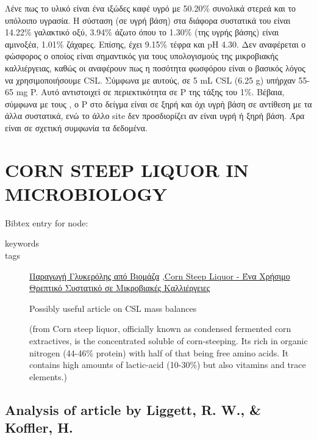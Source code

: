\documentclass[11pt]{article}
\begin{document}
\begin{description}
Λένε πως το υλικό είναι ένα ιξώδες καφέ υγρό με 50.20\% συνολικά στερεά και το υπόλοιπο υγρασία. Η σύσταση (σε υγρή βάση) στα διάφορα συστατικά του είναι 14.22\% γαλακτικό οξύ, 3.94\% άζωτο όπου το 1.30\% (της υγρής βάσης) είναι αμινοξέα, 1.01\% ζάχαρες. Επίσης, έχει 9.15\% τέφρα και pH 4.30. Δεν αναφέρεται ο φώσφορος ο οποίος είναι σημαντικός για τους υπολογισμούς της μικροβιακής καλλιέργειας, καθώς οι \cite{zhugeGlycerolProductionNovel2001} αναφέρουν πως η ποσότητα φωσφόρου είναι ο βασικός λόγος να χρησιμοποιήσουμε CSL. Σύμφωνα με αυτούς, σε 5 mL CSL (6.25 g) υπήρχαν 55-65 mg P. Αυτό αντιστοιχεί σε περιεκτικότητα σε P της τάξης του 1\%. Βέβαια, σύμφωνα με τους \cite{liggettCORNSTEEPLIQUOR}, ο P στο δείγμα είναι σε ξηρή και όχι υγρή βάση σε αντίθεση με τα άλλα συστατικά, ενώ το άλλο site δεν προσδιορίζει αν είναι υγρή ή ξηρή βάση. Άρα είναι σε σχετική συμφωνία τα δεδομένα.
\end{description}

\section{CORN STEEP LIQUOR IN MICROBIOLOGY}
\label{sec:org5a7b45d}
Bibtex entry for node: \cite{liggettCORNSTEEPLIQUOR}

\begin{description}
\item[{keywords}] 

\item[{tags}] \href{\detokenize{../../../../org_roam/παραγωγη_γλυκερολης_απο_βιομαζα-13-10-22.org}}{Παραγωγή Γλυκερόλης από Βιομάζα} ,\href{\detokenize{../../../../org_roam/corn_steep_liquor_ενα_χρησιμο_θρεπτικο_συστατικο_σε_μικροβιακες_καλλιεργειες-12-11-22.org}}{Corn Steep Liquor - Ένα Χρήσιμο Θρεπτικό Συστατικό σε Μικροβιακές Καλλιέργειες} 

Possibly useful article on CSL mass balances

(from \cite{loyChapter23Nutritional2019}  Corn steep liquor, officially known as condensed fermented corn extractives, is the concentrated soluble of corn-steeping. Its rich in organic nitrogen (44-46\% protein) with half of that being free amino acids. It contains high amounts of lactic-acid (10-30\%) but also vitamins and trace elements.)
\end{description}
\subsection{Analysis of article by Liggett, R. W., \& Koffler, H.}
\label{sec:orgce2627f}
\end{document}

